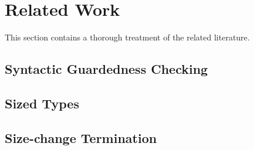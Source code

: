 \section{Related Work}
\label{sec:related_work}
This section contains a thorough treatment of the related literature. 

\subsection{Syntactic Guardedness Checking}

\subsection{Sized Types}

\subsection{Size-change Termination}
